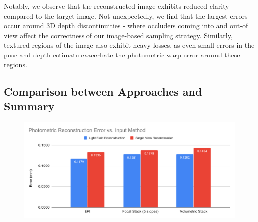 Notably, we observe that the reconstructed image exhibits reduced clarity compared to the target image. Not unexpectedly, we find that the largest errors occur around 3D depth discontinuities - where occluders coming into and out-of view affect the correctness of our image-based sampling strategy. Similarly, textured regions of the image also exhibit heavy losses, as even small errors in the pose and depth estimate exacerbate the photometric warp error around these regions.

\subsection{Comparison between Approaches and Summary}

\begin{figure}
\includegraphics[width=\textwidth]{images/result-examples/bargraphs/photometric-error-vs-inputmethod.pdf}
\end{figure}


























